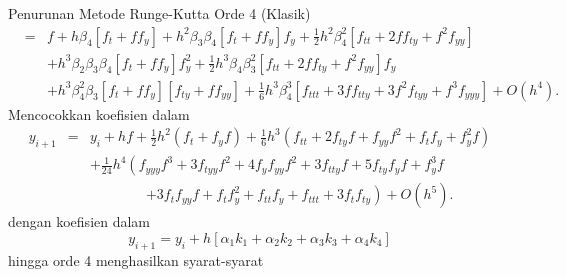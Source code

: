 \begin{digression}{Penurunan Metode Runge-Kutta Orde 4 (Klasik)}
\begin{eqnarray*}
 & = & f+h\beta_{4}\left[f_{t}+ff_{y}\right]+h^{2}\beta_{3}\beta_{4}\left[f_{t}+ff_{y}\right]f_{y}+\frac{1}{2}h^{2}\beta_{4}^{2}\left[f_{tt}+2ff_{ty}+f^{2}f_{yy}\right]\\
 &  & +h^{3}\beta_{2}\beta_{3}\beta_{4}\left[f_{t}+ff_{y}\right]f_{y}^{2}+\frac{1}{2}h^{3}\beta_{4}\beta_{3}^{2}\left[f_{tt}+2ff_{ty}+f^{2}f_{yy}\right]f_{y}\\
 &  & +h^{3}\beta_{4}^{2}\beta_{3}\left[f_{t}+ff_{y}\right]\left[f_{ty}+ff_{yy}\right]+\frac{1}{6}h^{3}\beta_{4}^{3}\left[f_{ttt}+3ff_{tty}+3f^{2}f_{tyy}+f^{3}f_{yyy}\right]+O(h^{4}).
\end{eqnarray*}
Mencocokkan koefisien dalam 
\begin{eqnarray*}
y_{i+1} & = & y_{i}+hf+\frac{1}{2}h^{2}(f_{t}+f_{y}f)+\frac{1}{6}h^{3}(f_{tt}+2f_{ty}f+f_{yy}f^{2}+f_{t}f_{y}+f_{y}^{2}f)\\
 &  & +\frac{1}{24}h^{4}\left(f_{yyy}f^{3}+3f_{tyy}f^{2}+4f_{y}f_{yy}f^{2}+3f_{tty}f+5f_{ty}f_{y}f+f_{y}^{3}f\right.\\
 &  & \qquad\qquad\left.+3f_{t}f_{yy}f+f_{t}f_{y}^{2}+f_{tt}f_{y}+f_{ttt}+3f_{t}f_{ty}\right)+O(h^{5}).
\end{eqnarray*}
dengan koefisien dalam 
\[
y_{i+1}=y_{i}+h\left[\alpha_{1}k_{1}+\alpha_{2}k_{2}+\alpha_{3}k_{3}+\alpha_{4}k_{4}\right]
\]
hingga orde 4 menghasilkan syarat-syarat 


\end{digression}
